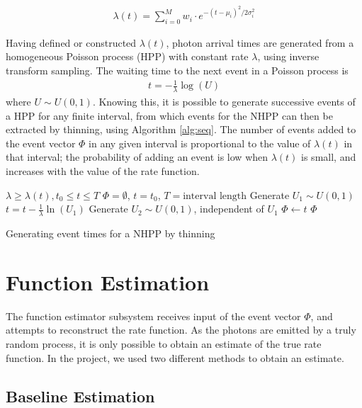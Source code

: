 \documentclass[11pt]{article}
\begin{document}
  \begin{align}
  \lambda(t) = \sum_{i=0}^M w_i\cdot e^{-(t-\mu_i)^2/2\sigma_i^2}
  \end{align}

  Having defined or constructed $\lambda(t)$, photon arrival times are generated
  from a homogeneous Poisson process (HPP) with constant rate $\lambda$, using
  inverse transform sampling. The waiting time to the next event in a Poisson
  process is \cite{1998art}
  \begin{align}\label{eq:homlambda}
  t=-\frac{1}{\lambda}\log(U)
  \end{align} where $U\sim U(0,1)$. Knowing this, it is possible to generate
  successive events of a HPP for any finite interval, from which events for the
  NHPP can then be extracted by thinning, using Algorithm \ref{alg:seq}. The
  number of events added to the event vector $\Phi$ in any given interval is
  proportional to the value of $\lambda(t)$ in that interval; the probability of
  adding an event is low when $\lambda(t)$ is small, and increases with the
  value of the rate function.

  \begin{algorithm}[H]
  \begin{algorithmic}[1]
  \REQUIRE $\lambda\geq \lambda(t), t_0 \leq t \leq T$
  \STATE $\Phi=\emptyset$, $t=t_0$, $T=\text{interval length}$
  \STATE Generate $U_1\sim U(0,1)$
  \STATE $t=t-\frac{1}{\lambda}\ln(U_1)$
  \STATE Generate $U_2\sim U(0,1)$, independent of $U_1$
  \STATE $\Phi \leftarrow t$
  \ENDIF
  \ENDWHILE
  \RETURN $\Phi$
  \end{algorithmic}
  \caption{Generating event times for a NHPP by thinning}
  \label{alg:seq}
  \end{algorithm}

\section{Function Estimation}
\label{sec-4}

  The function estimator subsystem receives input of the event vector $\Phi$, and
  attempts to reconstruct the rate function. As the photons are emitted by a
  truly random process, it is only possible to obtain an estimate of the true
  rate function. In the project, we used two different methods to obtain an
  estimate.
\subsection{Baseline Estimation}
\label{sec-4.1}
\end{document}
